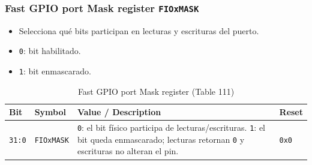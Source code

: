 \subsubsection{Fast GPIO port Mask register \texttt{FIOxMASK}}
\begin{itemize}
  \item Selecciona qué bits participan en lecturas y escrituras del puerto.
  \item \texttt{0}: bit habilitado.
  \item \texttt{1}: bit enmascarado.
\end{itemize}

\begin{table}[H]
  \centering
  \small
  \caption{Fast GPIO port Mask register (Table 111)}
  \begin{tabularx}{0.96\textwidth}{|>{\centering\arraybackslash}p{}|>{\raggedright\arraybackslash}p{}|>{\raggedright\arraybackslash}X|>{\centering\arraybackslash}p{}|}
    \hline
    \textbf{Bit} & \textbf{Symbol} & \textbf{Value / Description} & \textbf{Reset} \\
    \hline
    \texttt{31:0} & \texttt{FIOxMASK} & \texttt{0}: el bit físico participa de lecturas/escrituras. \texttt{1}: el bit queda enmascarado; lecturas retornan \texttt{0} y escrituras no alteran el pin. & \texttt{0x0} \\
    \hline
  \end{tabularx}
\end{table}

